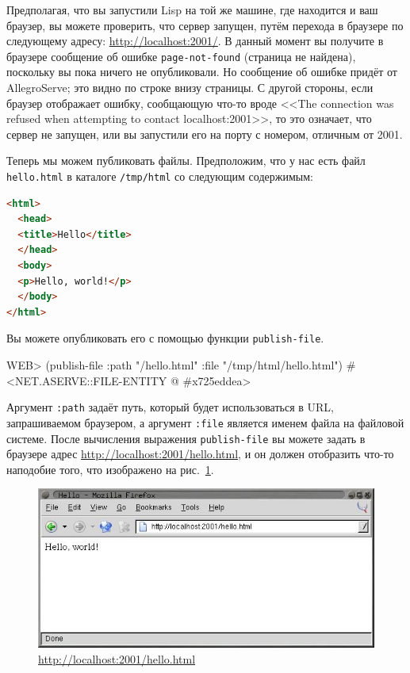 Предполагая, что вы запустили Lisp на той же машине, где находится и ваш браузер, вы
можете проверить, что сервер запущен, путём перехода в браузере по следующему адресу:
\url{http://localhost:2001/}. В данный момент вы получите в браузере сообщение об ошибке
\lstinline{page-not-found} (страница не найдена), поскольку вы пока ничего не опубликовали. Но
сообщение об ошибке придёт от AllegroServe; это видно по строке внизу страницы. С другой
стороны, если браузер отображает ошибку, сообщающую что-то вроде <<The connection was
refused when attempting to contact localhost:2001>>, то это означает, что сервер не
запущен, или вы запустили его на порту с номером, отличным от 2001.

Теперь мы можем публиковать файлы. Предположим, что у нас есть файл \lstinline{hello.html} в
каталоге \lstinline{/tmp/html} со следующим содержимым:

\begin{lstlisting}[language=HTML]
<html>
  <head>
  <title>Hello</title>
  </head>
  <body>
  <p>Hello, world!</p>
  </body>
</html>
\end{lstlisting}

Вы можете опубликовать его с помощью функции \lstinline{publish-file}.

\begin{myverb}
WEB> (publish-file :path "/hello.html" :file "/tmp/html/hello.html")
#<NET.ASERVE::FILE-ENTITY @ #x725eddea>
\end{myverb}

Аргумент \lstinline{:path} задаёт путь, который будет использоваться в URL, запрашиваемом
браузером, а аргумент \lstinline{:file} является именем файла на файловой системе. После
вычисления выражения \lstinline{publish-file} вы можете задать в браузере адрес
\url{http://localhost:2001/hello.html}, и он должен отобразить что-то наподобие того, что
изображено на рис.~\ref{fig:26-2}.

\begin{figure}[htb]
  \centering
  \includegraphics[scale=0.7]{images/hello-world.jpg}
  \caption{\url{http://localhost:2001/hello.html}}
  \label{fig:26-2}
\end{figure}

